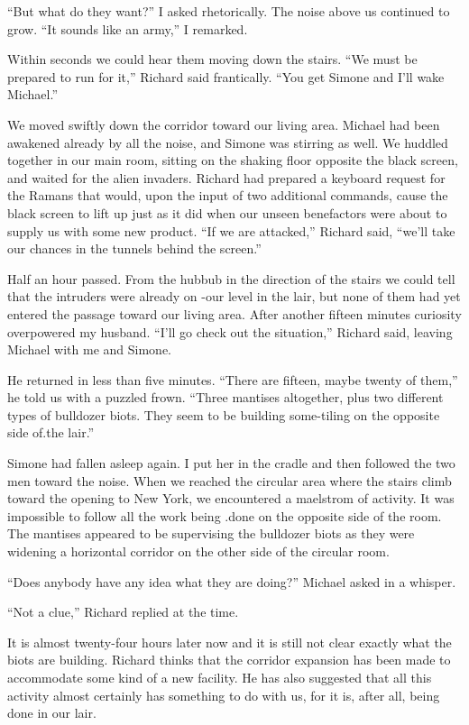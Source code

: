 \documentclass[]{article}
\begin{document}
“But what do they want?” I asked rhetorically. The noise above us continued to grow. “It sounds like an army,” I remarked.

Within seconds we could hear them moving down the stairs. “We must be prepared to run for it,” Richard said frantically. “You get Simone and I’ll wake Michael.”

We moved swiftly down the corridor toward our living area. Michael had been awakened already by all the noise, and Simone was stirring as well. We huddled together in our main room, sitting on the shaking floor opposite the black screen, and waited for the alien invaders. Richard had prepared a keyboard request for the Ramans that would, upon the input of two additional commands, cause the black screen to lift up just as it did when our unseen benefactors were about to supply us with some new product. “If we are attacked,” Richard said, “we’ll take our chances in the tunnels behind the screen.”

Half an hour passed. From the hubbub in the direction of the stairs we could tell that the intruders were already on -our level in the lair, but none of them had yet entered the passage toward our living area. After another fifteen minutes curiosity overpowered my husband. “I’ll go check out the situation,” Richard said, leaving Michael with me and Simone.

He returned in less than five minutes. “There are fifteen, maybe twenty of them,” he told us with a puzzled frown. “Three mantises altogether, plus two different types of bulldozer biots. They seem to be building some-tiling on the opposite side of.the lair.”

Simone had fallen asleep again. I put her in the cradle and then followed the two men toward the noise. When we reached the circular area where the stairs climb toward the opening to New York, we encountered a maelstrom of activity. It was impossible to follow all the work being .done on the opposite side of the room. The mantises appeared to be supervising the bulldozer biots as they were widening a horizontal corridor on the other side of the circular room.

“Does anybody have any idea what they are doing?” Michael asked in a whisper.

“Not a clue,” Richard replied at the time.

It is almost twenty-four hours later now and it is still not clear exactly what the biots are building. Richard thinks that the corridor expansion has been made to accommodate some kind of a new facility. He has also suggested that all this activity almost certainly has something to do with us, for it is, after all, being done in our lair.
\end{document}

